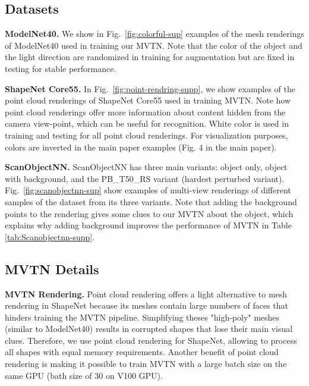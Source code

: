 \documentclass[10pt,twocolumn,letterpaper]{article}
\newcommand{\figLabel}{Fig.~}
\newcommand{\mysection}[1]{\noindent\textbf{#1.}}
\begin{document}
\subsection{Datasets}
\mysection{ModelNet40}
We show in \figLabel{\ref{fig:colorful-sup}} examples of the mesh renderings of ModelNet40 used in training our MVTN. Note that the color of the object and the light direction are randomized in training for augmentation but are fixed in testing for stable performance.   

\mysection{ShapeNet Core55}
In \figLabel{\ref{fig:point-rendring-supp}}, we show  examples of the point cloud renderings of ShapeNet Core55 \cite{shapenet,shrek17} used in training MVTN. Note how point cloud renderings offer more information about content hidden from the camera view-point, which can be useful for recognition. White color is used in training and testing for all point cloud renderings. For visualization purposes, colors are inverted in the main paper examples (Fig. 4 in the main paper).

\mysection{ScanObjectNN}
ScanObjectNN \cite{scanobjectnn} has three main variants: object only, object with background, and the PB\_T50\_RS variant (hardest perturbed variant). \figLabel{\ref{fig:scanobjectnn-sup}} show examples of multi-view renderings of different samples of the dataset from its three variants. Note that adding the background points to the rendering gives some clues to our MVTN about the object, which explains why adding background improves the performance of MVTN in Table \ref{tab:Scanobjectnn-supp}. 

\subsection{MVTN Details}

\mysection{MVTN Rendering}
 Point cloud rendering offers a light alternative to mesh rendering in ShapeNet because its meshes contain large numbers of faces that hinders training the MVTN pipeline. Simplifying theses "high-poly" meshes (similar to ModelNet40) results in corrupted shapes that lose their main visual clues. Therefore, we use point cloud rendering for ShapeNet, allowing to process all shapes with equal memory requirements. Another benefit of point cloud rendering is making it possible to train MVTN with a large batch size on the same GPU (bath size of 30 on V100 GPU).    
 
\end{document}
